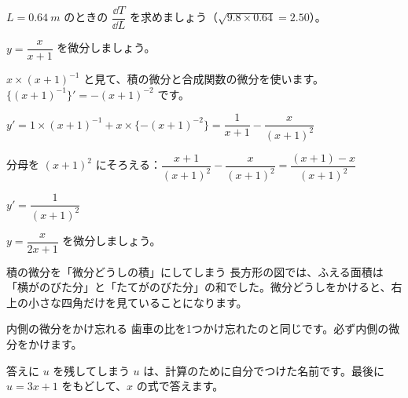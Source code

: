 \begin{jibun}
$L=\qty{0.64}{m}$ のときの $\dfrac{\dd T}{\dd L}$ を求めましょう（$\sqrt{9.8\times0.64}=2.50$）。
\end{jibun}

\begin{reidai}
$y=\dfrac{x}{x+1}$ を微分しましょう。\par
\kangaekata $x\times(x+1)^{-1}$ と見て、積の微分と合成関数の微分を使います。$\{(x+1)^{-1}\}'=-(x+1)^{-2}$ です。\par
\shiki $y'=1\times(x+1)^{-1}+x\times\{-(x+1)^{-2}\}=\dfrac{1}{x+1}-\dfrac{x}{(x+1)^2}$\par
\hspace*{2.6\zw}分母を $(x+1)^2$ にそろえる：$\dfrac{x+1}{(x+1)^2}-\dfrac{x}{(x+1)^2}=\dfrac{(x+1)-x}{(x+1)^2}$\par
\kotae $y'=\dfrac{1}{(x+1)^2}$
\end{reidai}

\begin{jibun}
$y=\dfrac{x}{2x+1}$ を微分しましょう。
\end{jibun}


\begin{tsumazuki}{積の微分を「微分どうしの積」にしてしまう}
長方形の図では、ふえる面積は「横がのびた分」と「たてがのびた分」の和でした。微分どうしをかけると、右上の小さな四角だけを見ていることになります。
\end{tsumazuki}

\begin{tsumazuki}{内側の微分をかけ忘れる}
歯車の比を1つかけ忘れたのと同じです。必ず内側の微分をかけます。
\end{tsumazuki}

\begin{tsumazuki}{答えに $u$ を残してしまう}
$u$ は、計算のために自分でつけた名前です。最後に $u=3x+1$ をもどして、$x$ の式で答えます。
\end{tsumazuki}


